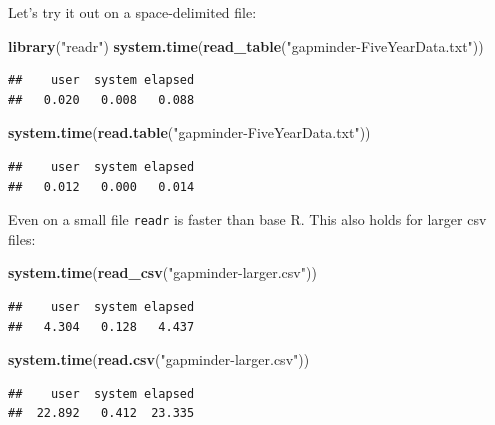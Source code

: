 \documentclass[]{article}
\newenvironment{Shaded}{\begin{snugshade}}{\end{snugshade}}
\newcommand{\KeywordTok}[1]{\textcolor[rgb]{0.13,0.29,0.53}{\textbf{{#1}}}}
\newcommand{\StringTok}[1]{\textcolor[rgb]{0.31,0.60,0.02}{{#1}}}
\newcommand{\NormalTok}[1]{{#1}}
\begin{document}
Let's try it out on a space-delimited file:

\begin{Shaded}
\begin{Highlighting}[]
\KeywordTok{library}\NormalTok{(}\StringTok{"readr"}\NormalTok{)}
\KeywordTok{system.time}\NormalTok{(}\KeywordTok{read_table}\NormalTok{(}\StringTok{"gapminder-FiveYearData.txt"}\NormalTok{))}
\end{Highlighting}
\end{Shaded}

\begin{verbatim}
##    user  system elapsed 
##   0.020   0.008   0.088
\end{verbatim}

\begin{Shaded}
\begin{Highlighting}[]
\KeywordTok{system.time}\NormalTok{(}\KeywordTok{read.table}\NormalTok{(}\StringTok{"gapminder-FiveYearData.txt"}\NormalTok{))}
\end{Highlighting}
\end{Shaded}

\begin{verbatim}
##    user  system elapsed 
##   0.012   0.000   0.014
\end{verbatim}

Even on a small file \texttt{readr} is faster than base R. This also
holds for larger csv files:

\begin{Shaded}
\begin{Highlighting}[]
\KeywordTok{system.time}\NormalTok{(}\KeywordTok{read_csv}\NormalTok{(}\StringTok{"gapminder-larger.csv"}\NormalTok{))}
\end{Highlighting}
\end{Shaded}

\begin{verbatim}
##    user  system elapsed 
##   4.304   0.128   4.437
\end{verbatim}

\begin{Shaded}
\begin{Highlighting}[]
\KeywordTok{system.time}\NormalTok{(}\KeywordTok{read.csv}\NormalTok{(}\StringTok{"gapminder-larger.csv"}\NormalTok{))}
\end{Highlighting}
\end{Shaded}

\begin{verbatim}
##    user  system elapsed 
##  22.892   0.412  23.335
\end{verbatim}
\end{document}
